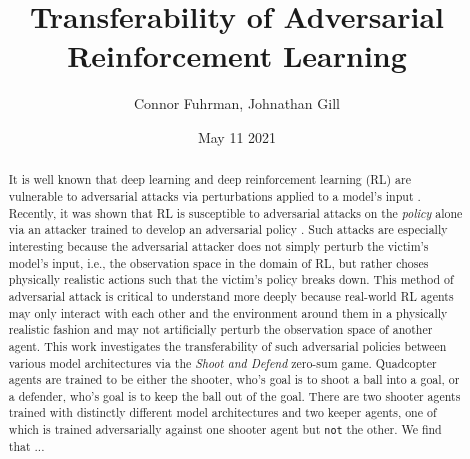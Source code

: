 \documentclass{article}
\title{Transferability of Adversarial Reinforcement Learning}
\author{Connor Fuhrman, Johnathan Gill}
\date{May 11 2021}
\begin{document}
\maketitle

\begin{abstract}
It is well known that deep learning and deep reinforcement learning (RL) are vulnerable to adversarial attacks via perturbations applied to a model's input \cite{Szegedy2014}. 
Recently, it was shown that RL is susceptible to adversarial attacks on the \textit{policy} alone via an attacker trained to develop an adversarial policy \cite{Gleave2019}. 
Such attacks are especially interesting because the adversarial attacker does not simply perturb the victim's model's input, i.e., the observation space in the domain of RL, but rather choses physically realistic actions such that the victim's policy breaks down. 
This method of adversarial attack is critical to understand more deeply because real-world RL agents may only interact with each other and the environment around them in a physically realistic fashion and may not artificially perturb the observation space of another agent. 
This work investigates the transferability of such adversarial policies between various model architectures via the \textit{Shoot and Defend} zero-sum game. 
Quadcopter agents are trained to be either the shooter, who's goal is to shoot a ball into a goal, or a defender, who's goal is to keep the ball out of the goal. 
There are two shooter agents trained with distinctly different model architectures and two keeper agents, one of which is trained adversarially against one shooter agent but \texttt{not} the other. 
We find that ...
\end{abstract}

\newpage
\end{document}
